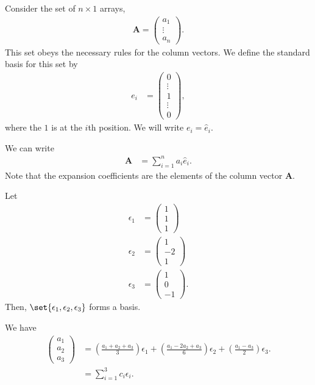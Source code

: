\documentclass[10pt]{mypackage}
\begin{document}
\begin{example}
Consider the set of $n\times 1$ arrays,
\begin{align*}
  \mathbf{A} = \begin{pmatrix}a_1\\\vdots\\a_n\end{pmatrix}.
\end{align*}
This set obeys the necessary rules for the column vectors. We define the standard basis for this set by
\begin{align*}
  e_i &= \begin{pmatrix}0\\\vdots\\1\\\vdots\\0\end{pmatrix},
\end{align*}
where the $1$ is at the $i$th position. We will write $e_i = \hat{e}_i$.\newline

We can write
\begin{align*}
  \mathbf{A} &= \sum_{i=1}^{n}a_i\hat{e}_i.
\end{align*}
Note that the expansion coefficients are the elements of the column vector $\mathbf{A}$.
\end{example}
\begin{example}
  Let
  \begin{align*}
    \epsilon_1 &= \begin{pmatrix}1\\1\\1\end{pmatrix}\\
    \epsilon_2 &= \begin{pmatrix}1\\-2\\1\end{pmatrix}\\
    \epsilon_3 &= \begin{pmatrix}1\\0\\-1\end{pmatrix}.
  \end{align*}
  Then, $\set{\epsilon_1,\epsilon_2,\epsilon_3}$ forms a basis.\newline

  We have
  \begin{align*}
    \begin{pmatrix}a_1\\a_2\\a_3\end{pmatrix} &= \left(\frac{a_1 + a_2 + a_3}{3}\right)\epsilon_1 + \left(\frac{a_1 - 2a_2 + a_3}{6}\right)\epsilon_2 + \left(\frac{a_1 - a_3}{2}\right)\epsilon_3.\\
                                              &= \sum_{i=1}^{3}c_i\epsilon_i.
  \end{align*}
\end{example}
\end{document}
